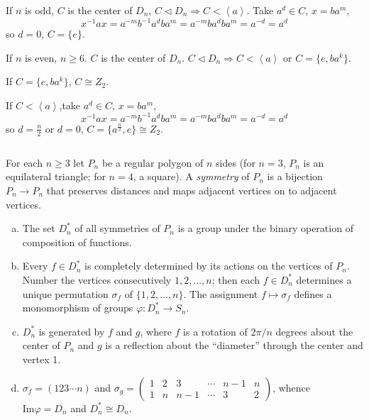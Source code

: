 \begin{answer}
    If $n$ is odd, $C$ is the center of $D_{n}$, $C\lhd D_{n}\Rightarrow C<\left\langle a\right\rangle$. Take $a^{d}\in C$, $x=ba^{m}$, \[x^{-1}ax=a^{-m}b^{-1}a^{d}ba^{m}=a^{-m}ba^{d}ba^{m}=a^{-d}=a^{d}\] so $d=0$, $C=\{e\}$.

    If $n$ is even, $n\geq 6$. $C$ is the center of $D_{n}$. $C\lhd D_{n}\Rightarrow C<\left\langle a\right\rangle$ or $C=\{e,ba^{k}\}$.
    
    If $C=\{e,ba^{k}\}$, $C\cong Z_{2}$.
    
    If $C<\left\langle a\right\rangle$,take $a^{d}\in C$, $x=ba^{m}$, \[x^{-1}ax=a^{-m}b^{-1}a^{d}ba^{m}=a^{-m}ba^{d}ba^{m}=a^{-d}=a^{d}\] so $d=\frac{n}{2}$ or $d=0$, $C=\{a^{\frac{n}{2}},e\}\cong Z_{2}$.
\end{answer}

$$ $$

\begin{ex}
    For each $n\geq 3$ let $P_{n}$ be a regular polygon of $n$ sides (for $n=3$, $P_{n}$ is an equilateral triangle; for $n=4$, a square). A \emph{symmetry} of $P_{n}$ is a bijection $P_{n}\to P_{n}$ that preserves distances and maps adjacent vertices on to adjacent vertices.
    
    \begin{enumerate}[(a)]
        \item The set $D_{n}^{*}$ of all symmetries of $P_{n}$ is a group under the binary operation of composition of functions.
        \item Every $f\in D_{n}^{*}$ is completely determined by its actions on the vertices of $P_{n}$. Number the vertices consecutively $1,2,\dots, n$; then each $f\in D_{n}^{*}$ determines a unique permutation $\sigma_{f}$ of $\{1,2,\dots, n\}$. The assignment $f\mapsto \sigma_{f}$ defines a monomorphism of groups $\varphi:D_{n}^{*}\to S_{n}$.
        \item $D_{n}^{*}$ is generated by $f$ and $g$, where $f$ is a rotation of $2\pi /n$ degrees about the center of $P_{n}$ and $g$ is a reflection about the ``diameter'' through the center and vertex 1.
        \item $\sigma_{f}=(123\cdots n)$ and $\sigma_{g}=\begin{pmatrix}
            1&2&3&\cdots&n-1&n\\1&n&n-1&\cdots&3&2
        \end{pmatrix}$, whence \\$\mathrm{Im}\varphi=D_{n}$ and $D_{n}^{*}\cong D_{n}$.
    \end{enumerate}
\end{ex}

